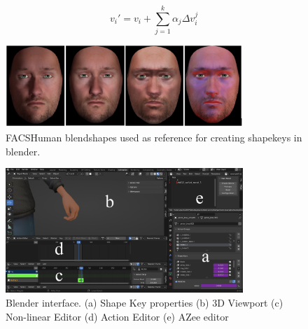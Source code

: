 \documentclass[../../main]{subfiles}
\begin{document}
\[
v_i' = v_i + \sum_{j=1}^{k} \alpha_j \Delta v_i^j
\]

\begin{figure}
    \centering
    \includegraphics[width=0.8\textwidth]{chapters/facial_expressions/images/facshuman_blendshapes.png}
    \caption{FACSHuman blendshapes used as reference for creating shapekeys in blender.}
    \label{ch:facial_expressions:fig:facshuman_blendshapes}
\end{figure}

\begin{figure}
    \centering
    \includegraphics[width=0.8\textwidth]{chapters/facial_expressions/images/shape_keys.png}
    \caption{Blender interface. (a) Shape Key properties (b) 3D Viewport (c) Non-linear Editor (d) Action Editor (e) AZee editor}
    \label{ch:facial_expressions:fig:shape_keys}
\end{figure}
\end{document}
